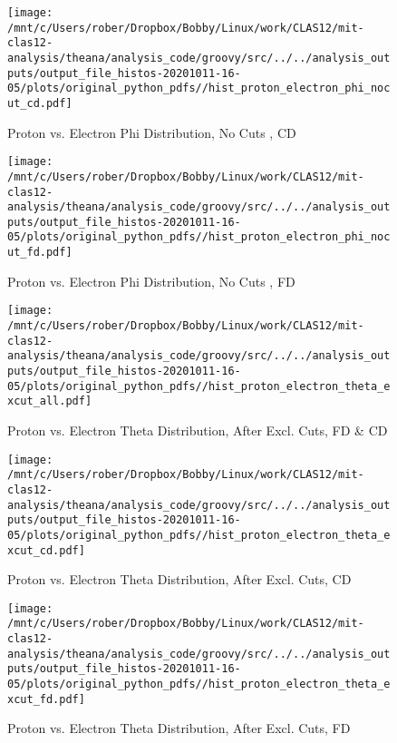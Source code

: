 \documentclass{article}
\begin{document}
\begin{landscape}
\begin{figure}[h]
        \texttt{[image: /mnt/c/Users/rober/Dropbox/Bobby/Linux/work/CLAS12/mit-clas12-analysis/theana/analysis\_code/groovy/src/../../analysis\_outputs/output\_file\_histos-20201011-16-05/plots/original\_python\_pdfs//hist\_proton\_electron\_phi\_nocut\_cd.pdf]}
        \captionsetup{textformat=empty,labelformat=blank}
        \caption{Proton vs. Electron Phi Distribution, No Cuts , CD}
    \end{figure}
    \clearpage
    
    \begin{figure}[h]
        \centering

        \texttt{[image: /mnt/c/Users/rober/Dropbox/Bobby/Linux/work/CLAS12/mit-clas12-analysis/theana/analysis\_code/groovy/src/../../analysis\_outputs/output\_file\_histos-20201011-16-05/plots/original\_python\_pdfs//hist\_proton\_electron\_phi\_nocut\_fd.pdf]}
        \captionsetup{textformat=empty,labelformat=blank}
        \caption{Proton vs. Electron Phi Distribution, No Cuts , FD}
    \end{figure}
    \clearpage
    
    \begin{figure}[h]
        \centering

        \texttt{[image: /mnt/c/Users/rober/Dropbox/Bobby/Linux/work/CLAS12/mit-clas12-analysis/theana/analysis\_code/groovy/src/../../analysis\_outputs/output\_file\_histos-20201011-16-05/plots/original\_python\_pdfs//hist\_proton\_electron\_theta\_excut\_all.pdf]}
        \captionsetup{textformat=empty,labelformat=blank}
        \caption{Proton vs. Electron Theta Distribution, After Excl. Cuts, FD \& CD}
    \end{figure}
    \clearpage
    
    \begin{figure}[h]
        \centering

        \texttt{[image: /mnt/c/Users/rober/Dropbox/Bobby/Linux/work/CLAS12/mit-clas12-analysis/theana/analysis\_code/groovy/src/../../analysis\_outputs/output\_file\_histos-20201011-16-05/plots/original\_python\_pdfs//hist\_proton\_electron\_theta\_excut\_cd.pdf]}
        \captionsetup{textformat=empty,labelformat=blank}
        \caption{Proton vs. Electron Theta Distribution, After Excl. Cuts, CD}
    \end{figure}
    \clearpage
    
    \begin{figure}[h]
        \centering

        \texttt{[image: /mnt/c/Users/rober/Dropbox/Bobby/Linux/work/CLAS12/mit-clas12-analysis/theana/analysis\_code/groovy/src/../../analysis\_outputs/output\_file\_histos-20201011-16-05/plots/original\_python\_pdfs//hist\_proton\_electron\_theta\_excut\_fd.pdf]}
        \captionsetup{textformat=empty,labelformat=blank}
        \caption{Proton vs. Electron Theta Distribution, After Excl. Cuts, FD}
    \end{figure}
    \clearpage
    

\end{landscape}
\end{document}

